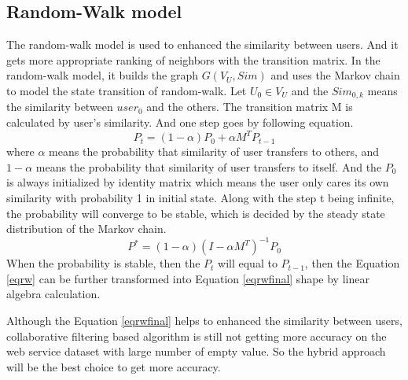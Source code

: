 \documentclass[conference]{IEEEtran}
\begin{document}
\subsection{Random-Walk model}
\par The random-walk model\cite{yin_network_2017} is used to enhanced the similarity between users. And it gets more appropriate ranking of neighbors with the transition matrix. In the random-walk model, it builds the graph $G(V_{U},Sim)$ and uses the Markov chain to model the state transition of random-walk. Let $U_{0} \in V_{U}$ and the $Sim_{0,k}$ means the similarity between $user_{0}$ and the others. The transition matrix M is calculated by user's similarity. And one step goes by following equation.
\begin{equation}
P_{t}=(1-\alpha)P_{0}+ \alpha M^{T}P_{t-1} 
\label{eqrw}
\end{equation}
where $\alpha$ means the probability that similarity of user transfers to others, and $1-\alpha$ means the probability that similarity of user transfers to itself. And the $P_{0}$ is always initialized by identity matrix which means the user only cares its own similarity with probability 1 in initial state. Along with the step t being infinite, the probability will converge to be stable, which is decided by the steady state distribution of the Markov chain. 
\begin{equation}
P^{*}=(1-\alpha)(I-\alpha M^{T})^{-1}P_{0}
\label{eqrwfinal}
\end{equation} 
When the probability is stable, then the $P_{t}$ will equal to $P_{t-1}$, then the Equation \ref{eqrw} can be further transformed into Equation \ref{eqrwfinal} shape by linear algebra calculation. 
\par Although the Equation \ref{eqrwfinal} helps to enhanced the similarity between users, collaborative filtering based algorithm is still not getting more accuracy on the web service dataset with large number of empty value. So the hybrid approach will be the best choice to get more accuracy.

\end{document}
